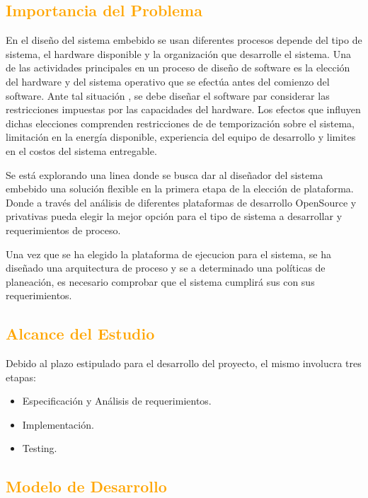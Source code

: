 \documentclass[a4paper,11pt]{article}
\begin{document}
\subsection{\textcolor{orange}{Importancia del Problema}}

En el diseño del sistema embebido se usan diferentes procesos depende del tipo de sistema, el hardware disponible y la organización que desarrolle el sistema. Una de las actividades principales en un proceso de diseño de software es la elección del hardware y del sistema operativo que se efectúa antes del comienzo del software. Ante tal situación , se debe diseñar el software par considerar las restricciones impuestas por las capacidades del hardware.
Los efectos que influyen dichas elecciones comprenden restricciones de de temporización sobre el sistema, limitación en la energía disponible, experiencia del equipo de desarrollo y limites en el costos del sistema entregable.
 
Se está explorando una linea donde se busca dar al diseñador del sistema embebido una solución flexible en la primera etapa de la elección de plataforma. Donde a través del análisis de diferentes plataformas de desarrollo OpenSource y privativas pueda elegir la mejor opción para el tipo de sistema a desarrollar y requerimientos de proceso. 
 
Una vez que se ha elegido la plataforma de ejecucion para el sistema, se ha diseñado una arquitectura de proceso y se a determinado una políticas de planeación, es necesario comprobar que el sistema cumplirá sus con sus requerimientos.

\subsection{\textcolor{orange}{Alcance del Estudio}}

Debido al plazo estipulado para el desarrollo del proyecto, el mismo involucra tres etapas: 

 \begin {itemize}
\item Especificación y Análisis de requerimientos.
\item Implementación.
\item Testing.
 \end {itemize}


\subsection{\textcolor{orange}{Modelo de Desarrollo}}
\end{document}
